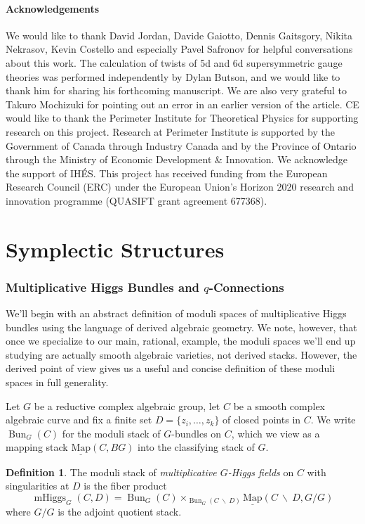 \documentclass[11pt, oneside, reqno]{amsart}
\theoremstyle{definition} \newtheorem{definition}{Definition}[section]
\theoremstyle{definition} \newtheorem{remark}[definition]{Remark}
\theoremstyle{definition} \newtheorem{remarks}[definition]{Remarks}
\theoremstyle{definition} \newtheorem{question}[definition]{Question}
\theoremstyle{definition} \newtheorem*{note}{Note}
\theoremstyle{definition} \newtheorem{example}[definition]{Example}
\theoremstyle{definition} \newtheorem{examples}[definition]{Examples}
\newcommand{\mr}[1]{\mathrm{#1}}
\newcommand{\bs}{\ \backslash \ }
\newcommand{\ul}[1]{\underline{#1}}
\DeclareMathOperator{\bun}{Bun}
\DeclareMathOperator{\mhiggs}{mHiggs}
\newcommand{\map}{\ul{\mr{Map}}}
\begin{document}
\subsection{Acknowledgements}
We would like to thank David Jordan, Davide Gaiotto, Dennis Gaitsgory, Nikita Nekrasov, Kevin Costello and especially Pavel Safronov for helpful conversations about this work. The calculation of twists of 5d and 6d supersymmetric gauge theories was performed independently by Dylan Butson, and we would like to thank him for sharing his forthcoming manuscript.  We are also very grateful to Takuro Mochizuki for pointing out an error in an earlier version of the article. CE would like to thank the Perimeter Institute for Theoretical Physics for supporting research on this project. Research at Perimeter Institute is supported by the Government of Canada through Industry Canada and by the Province of Ontario through the Ministry of Economic Development \& Innovation. We acknowledge the support of IH\'ES.  This project has received funding from the European Research Council (ERC) under the European Union's Horizon 2020 research and innovation programme (QUASIFT grant agreement 677368).

\renewcommand{\thepart}{\Alph{part}}
\part{Symplectic Structures} \label{part1}

\section{Multiplicative Higgs Bundles and $q$-Connections} \label{mhiggs_def_section}
We'll begin with an abstract definition of moduli spaces of multiplicative Higgs bundles using the language of derived algebraic geometry.  We note, however, that once we specialize to our main, rational, example, the moduli spaces we'll end up studying are actually smooth algebraic varieties, not derived stacks.  However, the derived point of view gives us a useful and concise definition of these moduli spaces in full generality.

Let $G$ be a reductive complex algebraic group, let $C$ be a smooth complex algebraic curve and fix a finite set $D = \{z_i, \ldots, z_k\}$ of closed points in $C$.  We write $\bun_G(C)$ for the moduli stack of $G$-bundles on $C$, which we view as a mapping stack $\map(C, BG)$ into the classifying stack of $G$.

\begin{definition}
The moduli stack of \emph{multiplicative $G$-Higgs fields} on $C$ with singularities at $D$ is the fiber product
\[\mhiggs_G(C,D) = \bun_G(C) \times_{\bun_G(C \! \bs \! D)} \map(C \! \bs \! D, G/G)\]
where $G/G$ is the adjoint quotient stack.
\end{definition}
\end{document}
